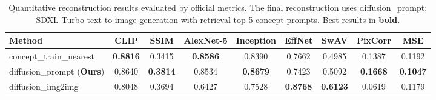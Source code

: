 \begin{table}[htbp]
\centering
\caption{Quantitative reconstruction results evaluated by official metrics. The final reconstruction uses diffusion\_prompt: SDXL-Turbo text-to-image generation with retrieval top-5 concept prompts. Best results in \textbf{bold}.}
\label{tab:reconstruction}
\begin{tabular}{lcccccccc}
\toprule
\textbf{Method} & \textbf{CLIP} & \textbf{SSIM} & \textbf{AlexNet-5} & \textbf{Inception} & \textbf{EffNet} & \textbf{SwAV} & \textbf{PixCorr} & \textbf{MSE} \\
\midrule
concept\_train\_nearest & \textbf{0.8816} & 0.3415 & \textbf{0.8586} & 0.8390 & 0.7662 & 0.4985 & 0.1387 & 0.1192 \\
diffusion\_prompt (\textbf{Ours}) & 0.8640 & \textbf{0.3814} & 0.8534 & \textbf{0.8679} & 0.7423 & 0.5092 & \textbf{0.1668} & \textbf{0.1047} \\
diffusion\_img2img & 0.8048 & 0.3694 & 0.6427 & 0.7528 & \textbf{0.8768} & \textbf{0.6123} & 0.0619 & 0.1179 \\
\bottomrule
\end{tabular}
\end{table}
